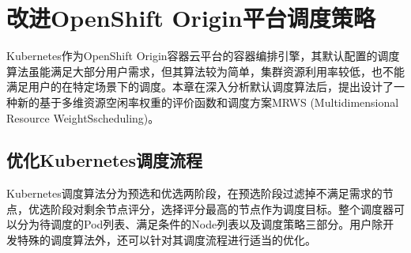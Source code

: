 \chapter{改进OpenShift Origin平台调度策略}
\label{cha:openshift}
Kubernetes作为OpenShift Origin容器云平台的容器编排引擎，其默认配置的调度算法虽能满足大部分用户需求，但其算法较为简单，集群资源利用率较低，也不能满足用户的在特定场景下的调度。本章在深入分析默认调度算法后，提出设计了一种新的基于多维资源空闲率权重的评价函数和调度方案MRWS (Multidimensional Resource WeightSscheduling)。

\section{优化Kubernetes调度流程}
Kubernetes调度算法分为预选和优选两阶段，在预选阶段过滤掉不满足需求的节点，优选阶段对剩余节点评分，选择评分最高的节点作为调度目标。整个调度器可以分为待调度的Pod列表、满足条件的Node列表以及调度策略三部分。用户除开发特殊的调度算法外，还可以针对其调度流程进行适当的优化。

